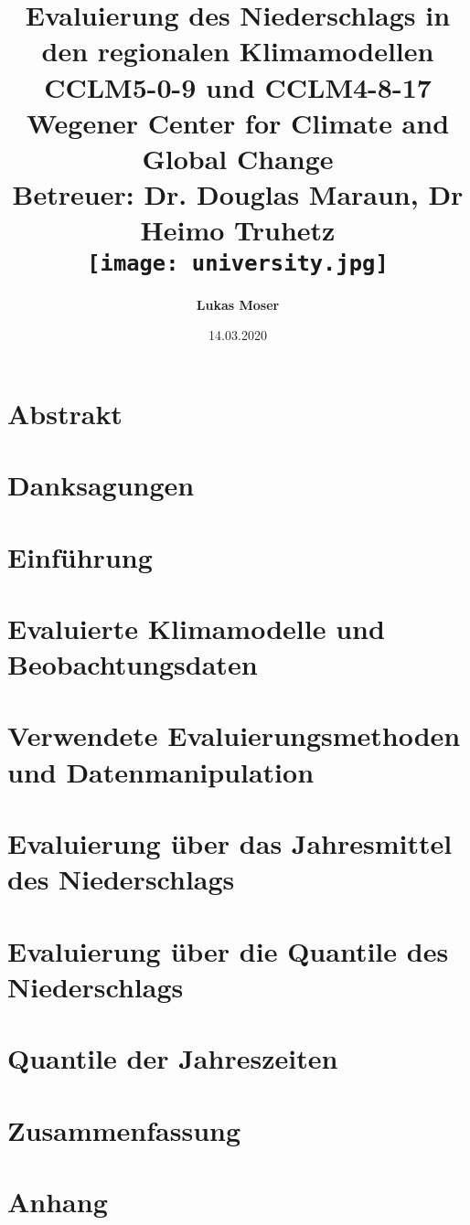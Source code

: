 \documentclass[12pt,twoside]{report}
\title{
	{\textbf{Evaluierung des Niederschlags in den regionalen Klimamodellen CCLM5-0-9 und CCLM4-8-17}}\\
	\vspace{20pt}
	{\Large Wegener Center for Climate and Global Change}\\
	{\large Betreuer: Dr. Douglas Maraun, Dr Heimo Truhetz}\\
	\vspace{20pt}
	{\texttt{[image: university.jpg]}}\\
}
\author{\Large{\textbf{Lukas Moser}}}
\date{14.03.2020}
\begin{document}
	\maketitle

	
	\chapter*{Abstrakt}
	
	
	\chapter*{Danksagungen}
	
	\newpage
	\tableofcontents
	
	\chapter{Einführung}
	\label{chap:intro}
	
	
	\chapter{Evaluierte Klimamodelle und Beobachtungsdaten}
	\label{chap:modells}
	
	
	\chapter{Verwendete Evaluierungsmethoden und Datenmanipulation}
	\label{chap:methods}
	
	
	\chapter{Evaluierung über das Jahresmittel des Niederschlags}
	\label{chap:mean}
	
	
	\chapter{Evaluierung über die Quantile des Niederschlags}
	\label{chap:quantile}
	
	
	\chapter{Quantile der Jahreszeiten}
	\label{chap:quantile_seasons}
	
	
	\chapter{Zusammenfassung}
	\label{chap:conclusion}
	
	
	\appendix
		\bgroup
		\titleformat{\chapter}{}{}{0pt}{\normalfont\Large\bfseries}
		\titlespacing*{\chapter}{0pt}{0pt}{20pt}
		\chapter{Anhang}
		
		
	\egroup
	\printbibliography[title=Referenzen]
\end{document}
